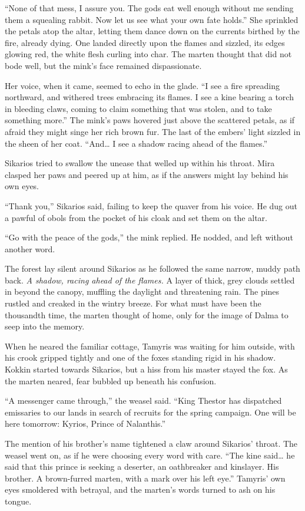``None of that mess, I assure you. The gods eat well enough without me sending them a squealing rabbit. Now let us see what your own fate holds.'' She sprinkled the petals atop the altar, letting them dance down on the currents birthed by the fire, already dying. One landed directly upon the flames and sizzled, its edges glowing red, the white flesh curling into char. The marten thought that did not bode well, but the mink's face remained dispassionate.

Her voice, when it came, seemed to echo in the glade. ``I see a fire spreading northward, and withered trees embracing its flames. I see a kine bearing a torch in bleeding claws, coming to claim something that was stolen, and to take something more.'' The mink's paws hovered just above the scattered petals, as if afraid they might singe her rich brown fur. The last of the embers' light sizzled in the sheen of her coat. ``And\ldots{} I see a shadow racing ahead of the flames.''

Sikarios tried to swallow the unease that welled up within his throat. Mira clasped her paws and peered up at him, as if the answers might lay behind his own eyes.

``Thank you,'' Sikarios said, failing to keep the quaver from his voice. He dug out a pawful of obols from the pocket of his cloak and set them on the altar.

``Go with the peace of the gods,'' the mink replied. He nodded, and left without another word.

The forest lay silent around Sikarios as he followed the same narrow, muddy path back. \emph{A shadow, racing ahead of the flames.} A layer of thick, grey clouds settled in beyond the canopy, muffling the daylight and threatening rain. The pines rustled and creaked in the wintry breeze. For what must have been the thousandth time, the marten thought of home, only for the image of Dalma to seep into the memory.

When he neared the familiar cottage, Tamyris was waiting for him outside, with his crook gripped tightly and one of the foxes standing rigid in his shadow. Kokkin started towards Sikarios, but a hiss from his master stayed the fox. As the marten neared, fear bubbled up beneath his confusion.

``A messenger came through,'' the weasel said. ``King Thestor has dispatched emissaries to our lands in search of recruits for the spring campaign. One will be here tomorrow: Kyrios, Prince of Nalanthis.''

The mention of his brother's name tightened a claw around Sikarios' throat. The weasel went on, as if he were choosing every word with care. ``The kine said\ldots{} he said that this prince is seeking a deserter, an oathbreaker and kinslayer. His brother. A brown-furred marten, with a mark over his left eye.'' Tamyris' own eyes smoldered with betrayal, and the marten's words turned to ash on his tongue.

